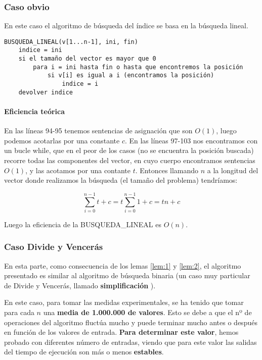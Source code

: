 \subsubsection{Caso obvio}

En este caso el algoritmo de búsqueda del índice se basa en la búsqueda lineal. 

\begin{lstlisting}
BUSQUEDA_LINEAL(v[1...n-1], ini, fin)
    indice = ini
    si el tamaño del vector es mayor que 0
        para i = ini hasta fin o hasta que encontremos la posición
            si v[i] es igual a i (encontramos la posición)
                indice = i
    devolver indice
\end{lstlisting}

 

\paragraph{Eficiencia teórica}

En las líneas 94-95 tenemos sentencias de asignación que son $O(1)$, luego podemos acotarlas por una constante $c$. 
En las líneas 97-103 nos encontramos con un bucle while, que en el peor de los casos (no se encuentra la posición buscada) 
recorre todas las componentes del vector, en cuyo cuerpo encontramos sentencias $O(1)$, y las acotamos por una contante $t$.
Entonces llamando $n$ a la longitud del vector donde realizamos la búsqueda (el tamaño del problema) tendríamos: 

\begin{equation*}
    \sum_{i=0}^{n-1} t + c = t \sum_{i=0}^{n-1} 1 + c = tn + c
\end{equation*}

Luego la eficiencia de la BUSQUEDA_LINEAL es $O(n)$.

\subsubsection{Caso Divide y Vencerás}

En esta parte, como consecuencia de los lemas \ref{lem:1} y \ref{lem:2}, el algoritmo presentado es similar 
al algoritmo de búsqueda binaria (un caso muy particular de Divide y Vencerás, 
llamado \textbf{simplificación} \cite{Verdegay2017}).

En este caso, para tomar las medidas experimentales, se ha tenido que tomar para cada $n$ una \textbf{media de 1.000.000
de valores}. Esto se debe a que el nº de operaciones del algoritmo fluctúa mucho y puede terminar mucho antes o después en función
de los valores de entrada. \textbf{Para determinar este valor}, hemos probado con diferentes número de entradas, 
viendo que para este valor las salidas del tiempo de ejecución son más o menos \textbf{estables}. 

